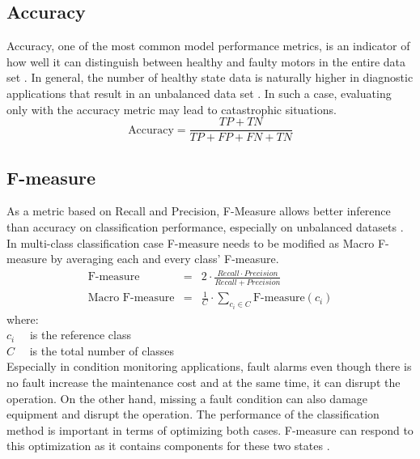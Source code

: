 \subsection{Accuracy}

Accuracy, one of the most common model performance metrics, is an indicator of how well it can distinguish between healthy and faulty motors in the entire data set \cite{grandini2020metrics}. In general, the number of healthy state data is naturally higher in diagnostic applications that result in an unbalanced data set \cite{han2021deep}. In such a case, evaluating only with the accuracy metric may lead to catastrophic situations. 
\begin{equation}
\text{Accuracy} = \displaystyle\frac{TP + TN}{TP + FP + FN + TN} 
\label{accuracy}	
\end{equation}
\subsection{F-measure}
As a metric based on Recall and Precision, F-Measure allows better inference than accuracy on classification performance, especially on unbalanced datasets \cite{he2009learning}. In multi-class classification case F-measure needs to be modified as Macro F-measure by averaging each and every class' F-measure.
\begin{eqnarray}
\text{F-measure} &=& 2\cdot\displaystyle\frac{Recall\cdot Precision}{Recall + Precision}\\
\text{Macro F-measure} &=& \displaystyle\frac{1}{C}\cdot \displaystyle\sum_{c_{i} \in C}\text{F-measure}({c_i})
\label{fmeas}	
\end{eqnarray}
where:\\
$c_{i} \quad$ is the reference class \\
$C \quad$ is the total number of classes\\
Especially in condition monitoring applications, fault alarms even though there is no fault increase the maintenance cost and at the same time, it can disrupt the operation. On the other hand, missing a fault condition can also damage equipment and disrupt the operation. The performance of the classification method is important in terms of optimizing both cases. F-measure can respond to this optimization as it contains components for these two states \cite{janssens2016convolutional,seliya2009study}.
